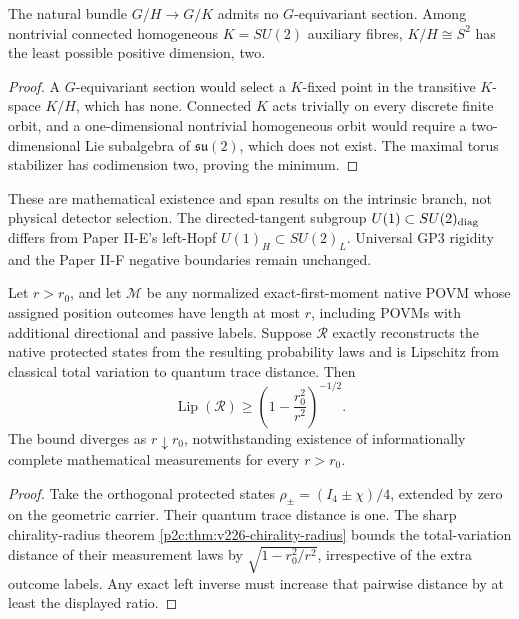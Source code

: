 \documentclass[12pt,a4paper]{article}
\begin{document}
\begin{lemma}
\label{p2c:lem:no-equivariant-tangent-section}
The natural bundle $G/H\to G/K$ admits no $G$-equivariant section.
Among nontrivial connected homogeneous $K=SU(2)$ auxiliary fibres,
$K/H\cong S^2$ has the least possible positive dimension, two.
\end{lemma}
\begin{proof}
A $G$-equivariant section would select a $K$-fixed point in the
transitive $K$-space $K/H$, which has none. Connected $K$ acts trivially
on every discrete finite orbit, and a one-dimensional nontrivial
homogeneous orbit would require a two-dimensional Lie subalgebra of
$\mathfrak{su}(2)$, which does not exist. The maximal torus stabilizer
has codimension two, proving the minimum.
\end{proof}

\begin{remark}
These are mathematical existence and span results on the intrinsic
branch, not physical detector selection. The directed-tangent subgroup
$U(1)\subset SU(2)_{\rm diag}$ differs from Paper II-E's left-Hopf
$U(1)_H\subset SU(2)_L$. Universal GP3 rigidity and the Paper II-F
negative boundaries remain unchanged.
\end{remark}


\begin{corollary}
\label{p2c:cor:v270-radius-reconstruction-instability}
Let $r>r_0$, and let $\mathcal M$ be any normalized exact-first-moment
native POVM whose assigned position outcomes have length at most $r$,
including POVMs with additional directional and passive labels.  Suppose
$\mathcal R$ exactly reconstructs the native protected states from the
resulting probability laws and is Lipschitz from classical total variation
to quantum trace distance.  Then
\[
 \boxed{\operatorname{Lip}(\mathcal R)\ge
 \left(1-\frac{r_0^2}{r^2}\right)^{-1/2}.}
\]
The bound diverges as $r\downarrow r_0$, notwithstanding existence of
informationally complete mathematical measurements for every $r>r_0$.
\end{corollary}
\begin{proof}
Take the orthogonal protected states $\rho_\pm=(I_4\pm\chi)/4$,
extended by zero on the geometric carrier.  Their quantum trace distance
is one.  The sharp chirality-radius theorem
\ref{p2c:thm:v226-chirality-radius} bounds the total-variation distance
of their measurement laws by $\sqrt{1-r_0^2/r^2}$, irrespective of the
extra outcome labels.  Any exact left inverse must increase that pairwise
distance by at least the displayed ratio.
\end{proof}
\end{document}
